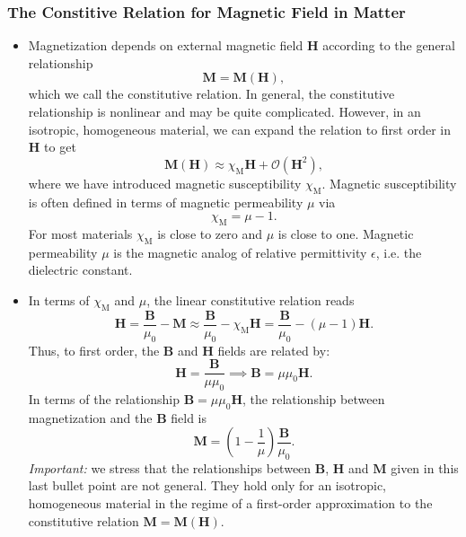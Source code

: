 \documentclass[11pt, a4paper]{article}
\renewcommand{\vec}[1]{\bm{#1}} %
\newcommand{\B}{\vec{B}} %
\renewcommand{\H}{\vec{H}}  %
\newcommand{\M}{\vec{M}}  %
\newcommand{\mm}{\mu_{0}}  %
\begin{document}
\subsubsection{The Constitive Relation for Magnetic Field in Matter}
\begin{itemize}
	\item Magnetization depends on external magnetic field $ \H $ according to the general relationship
	\begin{equation*}
		\M = \M(\H),
	\end{equation*}
	which we call the constitutive relation. In general, the constitutive relationship is nonlinear and may be quite complicated. However, in an isotropic, homogeneous material, we can expand the relation to first order in $ \H $ to get
	\begin{equation*}
		\M(\H) \approx \chi_{\text{M}} \H + \mathcal{O}(\H^{2}),
	\end{equation*}
    where we have introduced magnetic susceptibility $ \chi_{\text{M}} $. Magnetic susceptibility is often defined in terms of magnetic permeability $ \mu $ via
	\begin{equation*}
		\chi_{\text{M}} = \mu - 1.
	\end{equation*}
    For most materials $ \chi_{\text{M}} $ is close to zero and $ \mu $ is close to one. Magnetic permeability $ \mu $ is the magnetic analog of relative permittivity $ \epsilon $, i.e. the dielectric constant.
	
	\item In terms of $ \chi_{\text{M}} $ and $ \mu $, the linear constitutive relation reads
	\begin{equation*}
        \H = \frac{\B}{\mm} - \M \approx \frac{\B}{\mm} - \chi_{\text{M}} \H = \frac{\B}{\mm} - (\mu - 1)\H.
	\end{equation*}
	Thus, to first order, the $ \B $ and $ \H $ fields are related by:
	\begin{equation*}
		\H = \frac{\B}{\mu \mm} \implies \B = \mu \mm \H.
	\end{equation*}
    In terms of the relationship $ \B = \mu \mm \H $, the relationship between magnetization and the $ \B $ field is
	\begin{equation*}
		\M = \left(1 - \frac{1}{\mu}\right)\frac{\B}{\mm}.
	\end{equation*}
    \textit{Important:} we stress that the relationships between $ \B $, $ \H $ and $ \M $ given in this last bullet point are not general. They hold only for an isotropic, homogeneous material in the regime of a first-order approximation to the constitutive relation $ \M = \M(\H) $.
	
\end{itemize}
\end{document}
